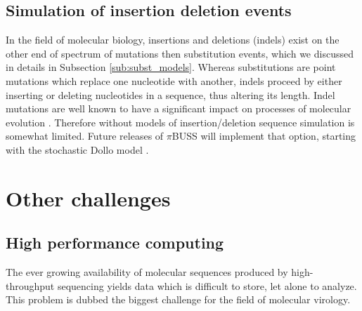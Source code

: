 \subsection{Simulation of insertion deletion events}

In the field of molecular biology, insertions and deletions (indels) exist on the other end of spectrum of mutations then substitution events, which we discussed in details in Subsection \ref{sub:subst_models}.
Whereas substitutions are point mutations which replace one nucleotide with another, indels proceed by either inserting or deleting nucleotides in a sequence, thus altering its length. 
Indel mutations are well known to have a significant impact on processes of molecular evolution \citep{Fletcher2009}. %
Therefore without models of insertion/deletion sequence simulation is somewhat limited.
Future releases of $\pi$BUSS will implement that option, starting with the stochastic Dollo model \citep{LeQuesne1974}.


\section{Other challenges}

\subsection{High performance computing}

The ever growing availability of molecular sequences produced by high-throughput sequencing yields data which is difficult to store, let alone to analyze.
This problem is dubbed the biggest challenge for the field of molecular virology. %

